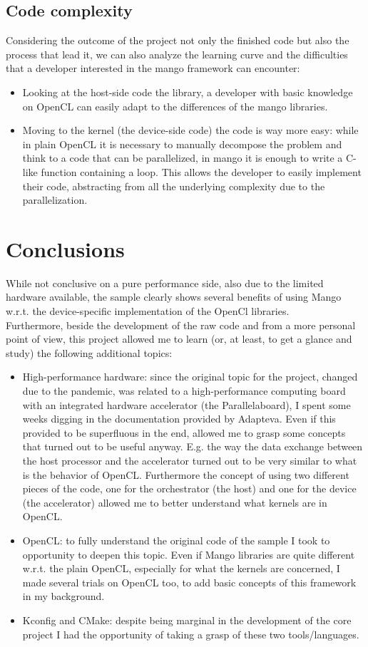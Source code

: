 \subsection{Code complexity}
Considering the outcome of the project not only the finished code but also the process that lead it, we can also analyze the learning curve and the difficulties that a developer interested in the mango framework can encounter:
\begin{itemize}
      \item Looking at the host-side code the library, a developer with basic knowledge on OpenCL can easily adapt to the differences of the mango libraries.
      \item Moving to the kernel (the device-side code) the code is way more easy: while in plain OpenCL it is necessary to manually decompose the problem and think to a code that can be parallelized, in mango it is enough to write a C-like function containing a loop. This allows the developer to easily implement their code, abstracting from all the underlying complexity due to the parallelization.
\end{itemize}


\section{Conclusions}
While not conclusive on a pure performance side, also due to the limited hardware available, the sample clearly shows several benefits of using Mango w.r.t. the device-specific implementation of the OpenCl libraries.\\Furthermore, beside the development of the raw code and from a more personal point of view, this project allowed me to learn (or, at least, to get a glance and study) the following additional topics:
\begin{itemize}
      \item High-performance hardware: since the original topic for the project, changed due to the pandemic, was related to a high-performance computing board with an integrated hardware accelerator (the Parallelaboard), I spent some weeks digging in the documentation provided by Adapteva.
      Even if this provided to be superfluous in the end, allowed me to grasp some concepts that turned out to be useful anyway. E.g. the way the data exchange between the host processor and the accelerator turned out to be very similar to what is the behavior of OpenCL. Furthermore the concept of using two different pieces of the code, one for the orchestrator (the host) and one for the device (the accelerator) allowed me to better understand what kernels are in OpenCL.
      \item OpenCL: to fully understand the original code of the sample I took to opportunity to deepen this topic. Even if Mango libraries are quite different w.r.t. the plain OpenCL, especially for what the kernels are concerned, I made several trials on OpenCL too, to add basic concepts of this framework in my background\cite{oclmanual}.
      \item Kconfig and CMake: despite being marginal in the development of the core project I had the opportunity of taking a grasp of these two tools/languages.
\end{itemize}


